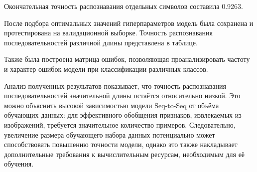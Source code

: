 \documentclass{altsu-report}
\begin{document}
Окончательная точность распознавания отдельных символов составила 0.9263.

После подбора оптимальных значений гиперпараметров модель была сохранена и протестирована на валидационной выборке. Точность распознавания последовательностей различной длины представлена в таблице.

Также была построена матрица ошибок, позволяющая проанализировать частоту и характер ошибок модели при классификации различных классов.

Анализ полученных результатов показывает, что точность распознавания последовательностей значительной длины остаётся относительно низкой. Это можно объяснить высокой зависимостью модели Seq-to-Seq от объёма обучающих данных: для эффективного обобщения признаков, извлекаемых из изображений, требуется значительное количество примеров. Следовательно, увеличение размера обучающего набора данных потенциально может способствовать повышению точности модели, однако это также накладывает дополнительные требования к вычислительным ресурсам, необходимым для её обучения.
\end{document}
